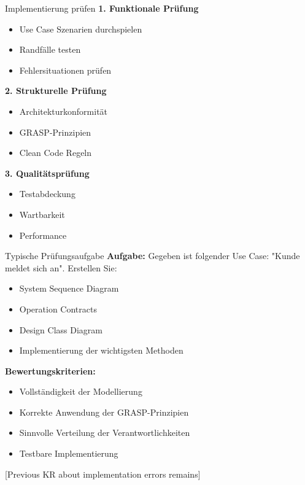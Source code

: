 \begin{KR}{Implementierung prüfen}
\textbf{1. Funktionale Prüfung}
\begin{itemize}
    \item Use Case Szenarien durchspielen
    \item Randfälle testen
    \item Fehlersituationen prüfen
\end{itemize}

\textbf{2. Strukturelle Prüfung}
\begin{itemize}
    \item Architekturkonformität
    \item GRASP-Prinzipien
    \item Clean Code Regeln
\end{itemize}

\textbf{3. Qualitätsprüfung}
\begin{itemize}
    \item Testabdeckung
    \item Wartbarkeit
    \item Performance
\end{itemize}
\end{KR}

\begin{example}{Typische Prüfungsaufgabe}
\textbf{Aufgabe:} 
Gegeben ist folgender Use Case: "Kunde meldet sich an". Erstellen Sie:
\begin{itemize}
    \item System Sequence Diagram
    \item Operation Contracts
    \item Design Class Diagram
    \item Implementierung der wichtigsten Methoden
\end{itemize}

\textbf{Bewertungskriterien:}
\begin{itemize}
    \item Vollständigkeit der Modellierung
    \item Korrekte Anwendung der GRASP-Prinzipien
    \item Sinnvolle Verteilung der Verantwortlichkeiten
    \item Testbare Implementierung
\end{itemize}
\end{example}

[Previous KR about implementation errors remains]